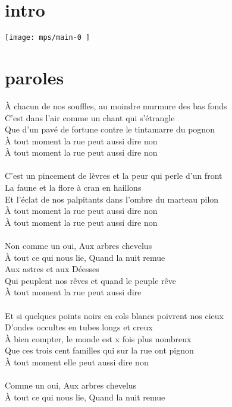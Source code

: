 \documentclass[11pt]{article}
\begin{document}
    \makesongtitle
\section*{intro}
      \texttt{[image:  mps/main-0 ]}

\newpage

\section*{paroles}
À chacun de nos souffles, au moindre murmure des bas fonds \\
C'est dans l'air comme un chant qui s'étrangle \\
Que d'un pavé de fortune contre le tintamarre du pognon \\
À tout moment la rue peut aussi dire non \\
À tout moment la rue peut aussi dire non \\
\\
C'est un pincement de lèvres et la peur qui perle d'un front \\
La faune et la flore à cran en haillons \\
Et l'éclat de nos palpitants dans l'ombre du marteau pilon \\
À tout moment la rue peut aussi dire non \\
À tout moment la rue peut aussi dire non \\
\\
Non comme un oui, Aux arbres chevelus \\
À tout ce qui nous lie, Quand la nuit remue \\
Aux astres et aux Déesses \\
Qui peuplent nos rêves et quand le peuple rêve \\
À tout moment la rue peut aussi dire \\
\\
Et si quelques points noirs en cols blancs poivrent nos cieux \\
D'ondes occultes en tubes longs et creux \\
À bien compter, le monde est x fois plus nombreux \\
Que ces trois cent familles qui sur la rue ont pignon \\
À tout moment elle peut aussi dire non \\
\\
Comme un oui, Aux arbres chevelus \\
À tout ce qui nous lie, Quand la nuit remue \\
\end{document}
